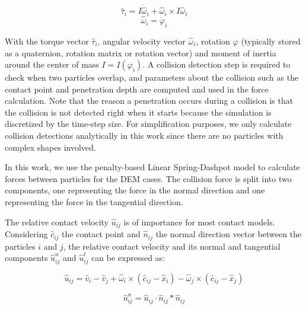 \documentclass[Afour,sageh,times]{sagej}
\newcommand{\RMchange}[1]{{\color{blue} #1}}
\begin{document}
\begin{equation}
    \hat{\tau}{_i} = I \dot{\hat \omega}_i + {\hat \omega}_i \times I {\hat \omega}_i \label{eq:newton_torque}
\end{equation}
\begin{equation}
    \hat{\omega}{_i} = \dot{\varphi}_i \label{eq:newton_angular_velocity}
\end{equation}

With the torque vector $\hat{\tau}{_i}$, angular velocity vector $\hat{\omega}{_i}$, rotation $\varphi$ (typically stored as a quaternion, rotation matrix or rotation vector) and moment of inertia \RMchange{around} the center of mass $I = I(\varphi_i)$.
A collision detection step is required to check when two particles overlap, and parameters about the collision such as the contact point and penetration depth are computed and used in the force calculation.
Note that the reason a penetration occurs during a collision is that the collision is not detected right when it starts because the simulation is discretized by the time-step size.
For simplification purposes, we only calculate collision detections analytically in this work since there are no particles with complex shapes involved.

In this work, we use the penalty-based Linear Spring-Dashpot model to calculate forces \RMchange{between} particles for the DEM cases.
The collision force is split into two components, one representing the force in the normal direction and one representing the force in the tangential direction.

The relative contact velocity $\hat{u}_{ij}$ is of importance for most contact models.
Considering $\hat{c}_{ij}$ the contact point and $\hat{n}_{ij}$ the normal direction vector between the particles $i$ and $j$, the relative contact velocity and its normal and tangential components $\hat{u}_{ij}^{n}$ and $\hat{u}_{ij}^{t}$ can be expressed as:


\begin{equation}
    \hat{u}_{ij} = \hat{v}_{i} - \hat{v}_{j} + \hat{\omega}_{i} \times (\hat{c}_{ij} - \hat{x}_{i}) - \hat{\omega}_{j} \times (\hat{c}_{ij} - \hat{x}_{j})
    \label{eq:relative_contact_velocity}
\end{equation}

\begin{equation}
    \hat{u}_{ij}^{n} = \hat{u}_{ij} \cdot \hat{n}_{ij} * \hat{n}_{ij}
    \label{eq:relative_contact_velocity_n}
\end{equation}
\end{document}
